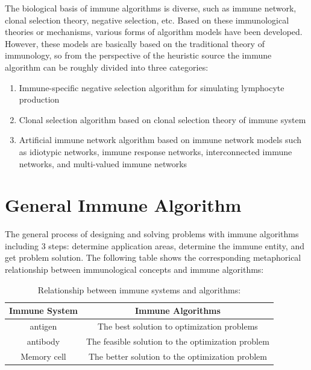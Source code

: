 \documentclass[11pt,a4paper,oldfontcommands]{memoir}
\begin{document}
The biological basis of immune algorithms is diverse, such as immune network, clonal selection theory, negative selection, etc. Based on these immunological theories or mechanisms, various forms of algorithm models have been developed. However, these models are basically based on the traditional theory of immunology, so from the perspective of the heuristic source the immune algorithm can be roughly divided into three categories:
\begin{enumerate} [(1)]
\item{Immune-specific negative selection algorithm for simulating lymphocyte production}
\item{Clonal selection algorithm based on clonal selection theory of immune system}
\item{Artificial immune network algorithm based on immune network models such as idiotypic networks, immune response networks, interconnected immune networks, and multi-valued immune networks
}
\end{enumerate}

\section{General Immune Algorithm}
The general process of designing and solving problems with immune algorithms including 3 steps: determine application areas, determine the immune entity, and get problem solution. The following table shows the corresponding metaphorical relationship between immunological concepts and immune algorithms: 

\begin{table}[!htb]
\centering
\caption {Relationship between immune systems and algorithms:}
\begin{tabular}{c|c}\hline
\toprule
\textbf{Immune System} & \textbf{Immune Algorithms}\\
\midrule
{antigen} & {The best solution to optimization problems} \\
{antibody} & {The feasible solution to the optimization problem} \\
{Memory cell} & {The better solution to the optimization problem}\\ 
\bottomrule
\end{tabular}
\end{table}
\end{document}
